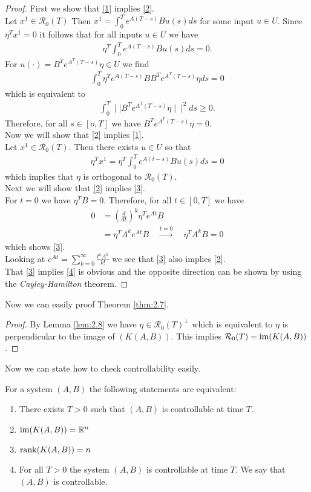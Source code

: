 \begin{proof}
	First we show that \ref{1} implies \ref{2}.\\Let $x^1 \in \mathcal{R}_0(T)$ Then $x^1=\int_0^Te^{A(T-s)}Bu(s)ds$ for some input $u\in U$. Since $\eta^Tx^1 = 0$ it follows that for all inputs $u\in U$ we have
	\begin{align*}
		\eta^T \int_0^Te^{A(T-s)}Bu(s)ds = 0.
	\end{align*}
	For $u(\cdot) = B^Te^{A^T(T-s)}\eta \in U$ we find
	\begin{align*}
		\int_0^T \eta^Te^{A(T-s)}BB^Te^{A^T(T-s)}\eta ds = 0
	\end{align*}
	which is equivalent to
	\begin{align*}
		\int_0^T \mid\mid   B^Te^{A^T(T-s)}\eta\mid\mid^2 ds \ge 0.
	\end{align*}
	Therefore, for all $s \in [o,T]$ we have $B^Te^{A^T(T-s)}\eta = 0$.\\Now we will show that \ref{2} implies \ref{1}.\\Let $x^1\in\mathcal{R}_0(T)$. Then there exists $u\in U$ so that
	\begin{align*}
		\eta^Tx^1 = \eta^T\int_0^Te^{A(t-s)}Bu(s)ds = 0
	\end{align*}
	which implies that $\eta$ is orthogonal to $\mathcal{R}_0(T)$.\\Next we will show that \ref{2} implies \ref{3}.\\For $t=0$ we have $\eta^TB=0$. Therefore, for all $t\in [0,T]$ we have
	\begin{align*}
		0 &= (\frac{d}{dt})^k\eta^Te^{At}B\\
		&= \eta^TA^ke^{At}B \quad \overset{t=0}{\longrightarrow} \quad\eta^TA^kB=0
	\end{align*}
	which shows \ref{3}.\\Looking at $e^{At}=\sum_{k=0}^{\infty}\frac{t^kA^k}{k!}$ we see that \ref{3} also implies \ref{2}.\\That \ref{3} implies \ref{4} is obvious and the opposite direction can be shown by using the \emph{Cayley-Hamilton} theorem.
\end{proof}
Now we can easily proof Theorem \ref{thm:2.7}.
\begin{proof}
	By Lemma \ref{lem:2.8} we have $\eta \in \mathcal{R}_0(T)^\perp$ which is equivalent to $\eta$ is perpendicular to the image of $(K(A,B))$. This implies $\mathcal{R}_0(T) = \operatorname{im}(K(A,B))$.
\end{proof}
Now we can state how to check controllability easily.
\begin{mycor}\label{cor:ctrb}
	For a system $(A,B)$ the following statements are equivalent:
	\begin{enumerate}
		\item There exists $T>0$ such that $(A,B)$ is controllable at time $T$.
		\item $\operatorname{im}(K(A,B)) = \mathbb{R}^n$
		\item $\operatorname{rank}(K(A,B)) = n$
		\item For all $T>0$ the system $(A,B)$ is controllable at time $T$. We say that $(A,B)$ is controllable.
	\end{enumerate}
\end{mycor}
